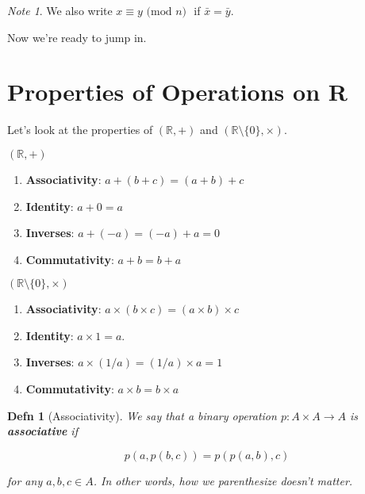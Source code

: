 \documentclass[12pt]{article}
\def\R{{\mathbb R}}
\renewcommand{\mod}[1]{\text{ (mod $#1$) }}
\newtheorem{definition}{Defn}
\theoremstyle{remark}
\theoremstyle{remark}
\theoremstyle{remark}
\theoremstyle{remark}
\theoremstyle{remark}
\newtheorem*{note}{Note}
\begin{document}
\begin{note}
	We also write $x \equiv y \mod{n} $ if $\bar x = \bar y$.
\end{note}

Now we're ready to jump in.

\section{Properties of Operations on R}

Let's look at the properties of $(\R, +)$ and $(\R \setminus \{0\}, \times)$.

\begin{multicols}{2}
	$(\R, +)$

	\begin{enumerate}
		\item {\bf Associativity}: $a + (b + c) = (a + b) + c$

		\item {\bf Identity}: $a + 0 = a$

		\item {\bf Inverses}: $a + (-a) = (-a) + a = 0$

		\item {\bf Commutativity}: $a + b = b + a$
	\end{enumerate}

	$(\R \setminus \{0\}, \times)$

	\begin{enumerate}
		\item {\bf Associativity}: $a \times (b \times c) = (a \times b) \times c$

		\item {\bf Identity}: $a \times 1 = a$.

		\item {\bf Inverses}: $a \times (1/a) = (1/a) \times a = 1$

		\item {\bf Commutativity}: $a \times b = b \times a$
	\end{enumerate}
\end{multicols}

\begin{definition}[Associativity]
	We say that a binary operation $p: A \times A \to A$ is {\bf associative} if

	\[
		p(a, p(b, c)) = p(p(a, b), c)
	\]

	for any $a, b, c \in A$. In other words, how we parenthesize doesn't matter.
\end{definition}
\end{document}
